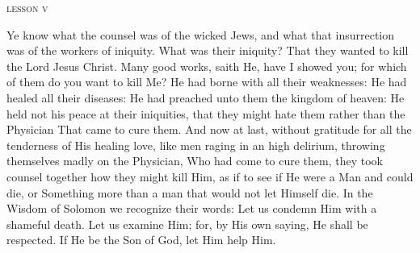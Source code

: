 \pagebreak
{}
\begin{center}{\textsc{lesson v}}\end{center}

{
{Ye know what the counsel was of the wicked Jews, and what that insurrection was of the workers of iniquity. What was their iniquity? That they wanted to kill the Lord Jesus Christ. Many good works, saith He, have I showed you; for which of them do you want to kill Me? He had borne with all their weaknesses: He had healed all their diseases: He had preached unto them the kingdom of heaven: He held not his peace at their iniquities, that they might hate them rather than the Physician That came to cure them. And now at last, without gratitude for all the tenderness of His healing love, like men raging in an high delirium, throwing themselves madly on the Physician, Who had come to cure them, they took counsel together how they might kill Him, as if to see if He were a Man and could die, or Something more than a man that would not let Himself die. In the Wisdom of Solomon we recognize their words: Let us condemn Him with a shameful death. Let us examine Him; for, by His own saying, He shall be respected. If He be the Son of God, let Him help Him.}
}%

\bigskip\bigskip
\pagebreak

\myrespsize
{\label{resp5_tenebrae}
}

